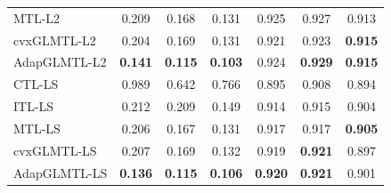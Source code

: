 \documentclass[aspectratio=43,spanish]{beamer}
\newcommand{\fmaxn}[1]{\textbf{#1}}
\newcommand{\fmod}[1]{\textsf{#1}}
\begin{document}
\begin{frame}
\begin{table}
{\begin{tabular}{lccc|ccc}
                \fmod{MTL-L2}       &            0.209 &            0.168 &            0.131         &             0.925 &             0.927 &             0.913 \\
                \fmod{cvxGLMTL-L2}     &            0.204 &            0.169 &            0.131       &             0.921 &             0.923 &             \fmaxn{0.915} \\
                \fmod{AdapGLMTL-L2} &            \fmaxn{0.141} &            \fmaxn{0.115} &            \fmaxn{0.103}   &             0.924 &             \fmaxn{0.929} &             \fmaxn{0.915} \\
                \midrule
                \fmod{CTL-LS}             &            0.989 &            0.642 &            0.766               &             0.895 &             0.908 &             0.894 \\
                \fmod{ITL-LS}             &            0.212 &            0.209 &            0.149               &             0.914 &             0.915 &             0.904 \\
                \fmod{MTL-LS}       &            0.206 &            0.167 &            0.131         &             0.917 &             0.917 &             \fmaxn{0.905} \\
                \fmod{cvxGLMTL-LS}     &            0.207 &            0.169 &            0.132       &             0.919 &             \fmaxn{0.921} &             0.897 \\
                \fmod{AdapGLMTL-LS} &            \fmaxn{0.136} &            \fmaxn{0.115} &            \fmaxn{0.106}   &             \fmaxn{0.920} &             \fmaxn{0.921} &             0.901 \\
                \bottomrule
            \end{tabular}
            }
        \end{table}

\end{frame}
\end{document}
